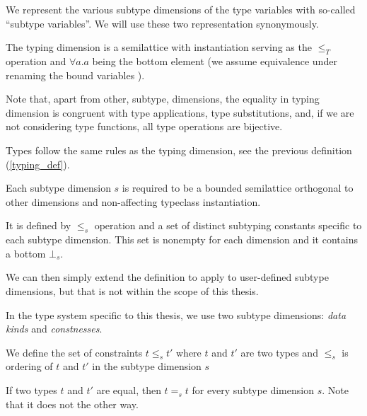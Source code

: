 We represent the various subtype dimensions of the type variables with so-called ``subtype variables''. We will use these two representation synonymously.


\begin{defn}
    \label{typing_def}
    The typing dimension is a semilattice with instantiation  serving as the $\leq_T$ operation and $\forall a . a$ being the bottom element (we assume equivalence under renaming the bound variables ).

    Note that, apart from other, subtype, dimensions, the equality in typing dimension is congruent with type applications, type substitutions, and, if we are not considering type functions, all type operations are bijective.
\end{defn}

\begin{defn}[Types]
    Types follow the same rules as the typing dimension, see the previous definition (\ref{typing_def}).
\end{defn}

\begin{defn}
    Each subtype dimension $s$ is required to be a bounded semilattice orthogonal to other dimensions and non-affecting typeclass instantiation.
    
    It is defined by $\leq_s$ operation and a set of distinct subtyping constants specific to each subtype dimension. This set is nonempty for each dimension and it contains a bottom $\bot_s$.
    
    We can then simply extend the definition to apply to user-defined subtype dimensions, but that is not within the scope of this thesis.

    In the type system specific to this thesis, we use two subtype dimensions: \textit{data kinds} and \textit{constnesses}.
\end{defn}

\begin{defn}
    We define the set of constraints $t \leq_s t'$ where $t$ and $t'$ are two types and $\leq_s$ is ordering of $t$ and $t'$ in the subtype dimension $s$
\end{defn}

\begin{defn}
    If two types $t$ and $t'$ are equal, then $t =_s t$ for every subtype dimension $s$. Note that it does not the other way.
\end{defn}

